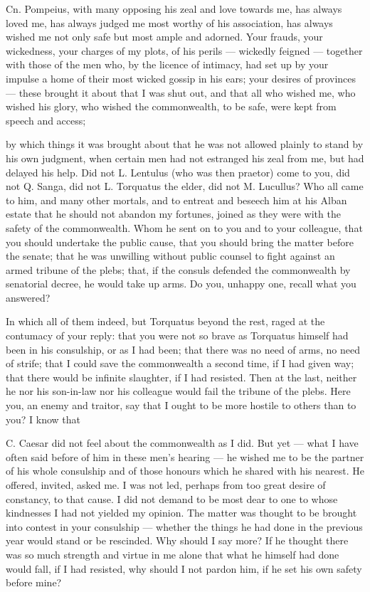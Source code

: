  Cn. Pompeius, with many opposing his zeal and love towards me, has always loved me, has always judged me most worthy of his association, has always wished me not only safe but most ample and adorned. Your frauds, your wickedness, your charges of my plots, of his perils — wickedly feigned — together with those of the men who, by the licence of intimacy, had set up by your impulse a home of their most wicked gossip in his ears; your desires of provinces — these brought it about that I was shut out, and that all who wished me, who wished his glory, who wished the commonwealth, to be safe, were kept from speech and access;

 by which things it was brought about that he was not allowed plainly to stand by his own judgment, when certain men had not estranged his zeal from me, but had delayed his help. Did not L. Lentulus (who was then praetor) come to you, did not Q. Sanga, did not L. Torquatus the elder, did not M. Lucullus? Who all came to him, and many other mortals, and to entreat and beseech him at his Alban estate that he should not abandon my fortunes, joined as they were with the safety of the commonwealth. Whom he sent on to you and to your colleague, that you should undertake the public cause, that you should bring the matter before the senate; that he was unwilling without public counsel to fight against an armed tribune of the plebs; that, if the consuls defended the commonwealth by senatorial decree, he would take up arms. Do you, unhappy one, recall what you answered?

 In which all of them indeed, but Torquatus beyond the rest, raged at the contumacy of your reply: that you were not so brave as Torquatus himself had been in his consulship, or as I had been; that there was no need of arms, no need of strife; that I could save the commonwealth a second time, if I had given way; that there would be infinite slaughter, if I had resisted. Then at the last, neither he nor his son-in-law nor his colleague would fail the tribune of the plebs. Here you, an enemy and traitor, say that I ought to be more hostile to others than to you? I know that

 C. Caesar did not feel about the commonwealth as I did. But yet — what I have often said before of him in these men's hearing — he wished me to be the partner of his whole consulship and of those honours which he shared with his nearest. He offered, invited, asked me. I was not led, perhaps from too great desire of constancy, to that cause. I did not demand to be most dear to one to whose kindnesses I had not yielded my opinion. The matter was thought to be brought into contest in your consulship — whether the things he had done in the previous year would stand or be rescinded. Why should I say more? If he thought there was so much strength and virtue in me alone that what he himself had done would fall, if I had resisted, why should I not pardon him, if he set his own safety before mine?

